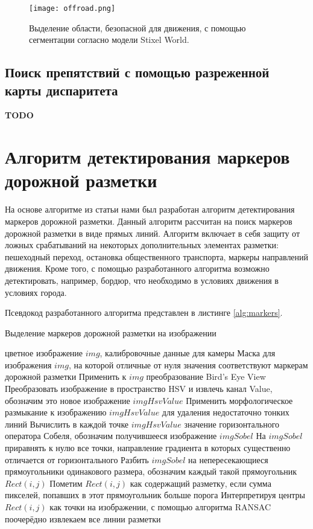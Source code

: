 \documentclass[aps,%
14pt,%
final,%
oneside,
onecolumn,%
musixtex, %
superscriptaddress,%
centertags]{extarticle} %
\begin{document}
\begin{figure}[H]
\centering
\texttt{[image: offroad.png]}
\caption{Выделение области, безопасной для движения, с помощью сегментации согласно модели Stixel World.}
\label{fig:stix_offroad}
\end{figure}


\subsection{Поиск препятствий с помощью разреженной карты диспаритета}

\textbf{\Large \color{red} TODO }



\newpage
\section{Алгоритм детектирования маркеров дорожной разметки}

На основе алгоритме из статьи \cite{aly2008real} нами был разработан алгоритм детектирования маркеров дорожной разметки. Данный алгоритм рассчитан на поиск маркеров дорожной разметки в виде прямых линий. Алгоритм включает в себя защиту от ложных срабатываний на некоторых дополнительных элементах разметки: пешеходный переход, остановка общественного транспорта, маркеры направлений движения. Кроме того, с помощью разработанного алгоритма возможно детектировать, например, бордюр, что необходимо в условиях движения в условиях города.

Псевдокод разработанного алгоритма представлен в листинге \ref{alg:markers}.

\begin{algorithm}
\caption{Выделение маркеров дорожной разметки на изображении}\label{alg:euclid}
\label{alg:markers}
\begin{algorithmic}[1]
\Require цветное изображение $img$, калибровочные данные для камеры
\Ensure Маска для изображения $img$, на которой отличные от нуля значения соответствуют маркерам дорожной разметки
\State Применить к $img$ преобразование Bird's Eye View
\State Преобразовать изображение в пространство HSV и извлечь канал Value, обозначим это новое изображение $imgHsvValue$
\State Применить морфологическое размыкание к изображению $imgHsvValue$ для удаления недостаточно тонких линий
\State Вычислить в каждой точке $imgHsvValue$ значение горизонтального оператора Собеля, обозначим получившееся изображение $imgSobel$
\State На $imgSobel$ приравнять к нулю все точки, направление градиента в которых существенно отличается от горизонтального
\State Разбить $imgSobel$ на непересекающиеся прямоугольники одинакового размера, обозначим каждый такой прямоугольник $Rect(i, j)$
\State Пометим $Rect(i, j)$ как содержащий разметку, если сумма пикселей, попавших в этот прямоугольник больше порога
\EndFor
\State Интерпретируя центры $Rect(i, j)$ как точки на изображении, с помощью алгоритма RANSAC поочерёдно извлекаем все линии разметки
\end{algorithmic}
\end{algorithm}
\end{document}
